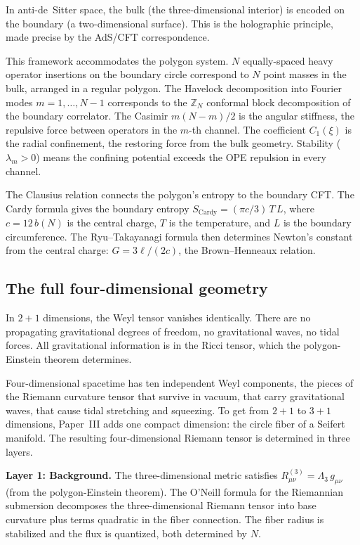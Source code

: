 In anti-de~Sitter space, the bulk (the three-dimensional interior) is
encoded on the boundary (a two-dimensional surface). This is the
holographic principle, made precise by the AdS/CFT correspondence.

This framework accommodates the polygon system. $N$ equally-spaced heavy
operator insertions on the boundary circle correspond to $N$ point masses
in the bulk, arranged in a regular polygon. The Havelock decomposition
into Fourier modes $m = 1, \ldots, N-1$ corresponds to the
$\mathbb{Z}_N$ conformal block decomposition of the boundary correlator.
The Casimir $m(N-m)/2$ is the angular stiffness, the repulsive force
between operators in the $m$-th channel. The coefficient $C_1(\xi)$ is
the radial confinement, the restoring force from the bulk geometry.
Stability ($\lambda_m > 0$) means the confining potential exceeds the
OPE repulsion in every channel.

The Clausius relation connects the polygon's entropy to the boundary
CFT. The Cardy formula gives the boundary entropy
$S_{\text{Cardy}} = (\pi c/3)\,T\,L$,
where $c = 12\,b(N)$ is the central charge, $T$ is the temperature, and
$L$ is the boundary circumference. The Ryu--Takayanagi formula then
determines Newton's constant from the central charge:
$G = 3\ell/(2c)$, the Brown--Henneaux relation.

\subsection*{The full four-dimensional geometry}

In $2{+}1$ dimensions, the Weyl tensor vanishes identically. There are
no propagating gravitational degrees of freedom, no gravitational waves,
no tidal forces. All gravitational information is in the Ricci tensor,
which the polygon-Einstein theorem determines.

Four-dimensional spacetime has ten independent Weyl components, the
pieces of the Riemann curvature tensor that survive in vacuum, that
carry gravitational waves, that cause tidal stretching and squeezing.
To get from $2{+}1$ to $3{+}1$ dimensions, Paper~III adds one compact
dimension: the circle fiber of a Seifert manifold. The resulting
four-dimensional Riemann tensor is determined in three layers.

\textbf{Layer 1: Background.} The three-dimensional metric satisfies
$R_{\mu\nu}^{(3)} = \Lambda_3\, g_{\mu\nu}$ (from the polygon-Einstein
theorem). The O'Neill formula for the Riemannian submersion decomposes
the three-dimensional Riemann tensor into base curvature plus terms
quadratic in the fiber connection. The fiber radius is stabilized and
the flux is quantized, both determined by $N$.

